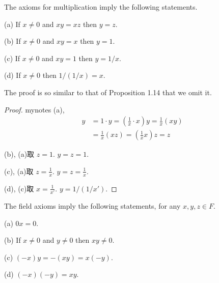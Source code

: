 
\begin{myProposition}\label{Proposition:1.15}
The axioms for multiplication imply the following statements.

(a) If $x\neq0$ and $xy=xz$ then $y=z$.

(b) If $x\neq0$ and $xy=x$ then $y=1$.

(c) If $x\neq0$ and $xy=1$ then $y=1/x$.

(d) If $x\neq0$ then $1/(1/x) = x$.
\end{myProposition}

The proof is so similar to that of Proposition 1.14 that we omit it.


\begin{proof}
mynotes
(a),  
\begin{align*}
    y&=1\cdot y=\left(\frac{1}{x}\cdot x\right)y =\frac{1}{x}\left( xy \right)\\
    &=\frac{1}{x}(xz) =\left(\frac{1}{x}x\right)z = z
\end{align*}

(b), (a)取  $z=1$. $y=z=1$.

(c), (a)取  $z=\frac{1}{x}$. $y=z=\frac{1}{x}$.

(d), (c)取  $x=\frac{1}{x'}$. $y=1/(1/x')$.
\end{proof}

\begin{myProposition}\label{Proposition:1.16}
    The field axioms imply the following statements, for any $x, y, z \in F$.

    (a) $0x=0$.

    (b) If $x\neq 0$ and $y\neq 0$ then $xy\neq 0$.

    (c) $(-x)y=-(xy)=x(-y)$.

    (d) $(-x)(-y)=xy$.
\end{myProposition}

